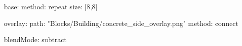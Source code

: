 base:
  method: repeat
  size: [8,8]

overlay:
  path: "Blocks/Building/concrete_side_overlay.png"
  method: connect

blendMode: subtract